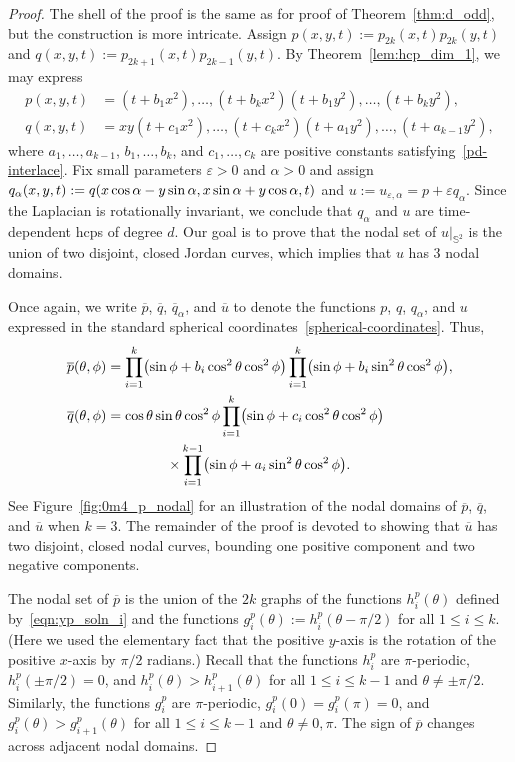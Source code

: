 \documentclass[10pt]{amsart}
\theoremstyle{definition}\newtheorem{defi}[theo]{Definition}\newtheorem{rema}[theo]{Remark}\newtheorem{exam}[theo]{Example}\newtheorem{exem}[theo]{Example}\newtheorem{nota}[theo]{Notation}
\newcommand{\sphere}{\mathbb{S}}
\newcommand{\ol}{\overline}
\renewcommand{\epsilon}{\varepsilon}
\let\originalleft\left
\let\originalright\right
\renewcommand{\left}{\mathopen{}\mathclose\bgroup\originalleft}
\renewcommand{\right}{\aftergroup\egroup\originalright}
\begin{document}
\begin{proof}
The shell of the proof is the same as for proof of Theorem~\ref{thm:d_odd}, but the construction is more intricate. Assign $p(x,y,t) := p_{2k}(x,t)p_{2k}(y,t)$ and $q(x,y,t):=p_{2k+1}(x,t)p_{2k-1}(y,t)$. By Theorem~\ref{lem:hcp_dim_1}, we may express
\begin{align*}
p(x,y,t) &= (t + b_1 x^2) ,\dots, (t + b_k x^2) (t+ b_1 y^2) ,\dots,  (t + b_ky^2),\\
q(x,y,t) &= xy(t + c_1 x^2),\dots, (t + c_{k} x^2)(t+a_1 y^2),\dots,  (t + a_{k-1} y^2),
\end{align*}
where $a_1,\dots,a_{k-1}$, $b_1,\dots,b_k$, and $c_1,\dots, c_k$ are positive constants satisfying~\eqref{pd-interlace}. Fix small parameters $\epsilon>0$ and $\alpha>0$ and assign $q_\alpha(x,y,t) := q(x \cos \alpha - y \sin \alpha,\linebreak x \sin \alpha + y \cos \alpha, t)$ and $u:=u_{\epsilon,\alpha}=p+\epsilon q_\alpha$. Since the Laplacian is rotationally invariant, we conclude that $q_\alpha$ and $u$ are time-dependent hcps of degree $d$. Our goal is to prove that the nodal set of $u|_{\sphere^2}$ is the union of two disjoint, closed Jordan curves, which implies that $u$ has 3 nodal domains.



Once again, we write $\ol{p}$, $\ol{q}$, $\ol{q}_\alpha$, and $\ol{u}$ to denote the functions $p$, $q$, $q_\alpha$, and $u$ expressed in the standard spherical coordinates~\eqref{spherical-coordinates}. Thus,
\begin{multline}
\begin{aligned}[t]
\ol{p}(\theta, \phi) & = \prod_{i=1}^k \left(\sin\phi + b_i \cos^2\theta \cos^2\phi\right)\prod_{i=1}^k\left(\sin\phi+b_i\sin^2 \theta \cos^2 \phi\right), \\
\ol{q}(\theta, \phi) & = \cos \theta \sin \theta \cos^2\phi \prod_{i=1}^{k} \left(\sin\phi+c_i\cos^2\theta\cos^2 \phi\right)
\end{aligned}
\\
\times\prod_{i=1}^{k-1} \left(\sin\phi+a_i\sin^2\theta\cos^2 \phi\right).
\end{multline}
See Figure~\ref{fig:0m4_p_nodal} for an illustration of the nodal domains of $\ol{p}$, $\ol{q}$, and $\ol{u}$ when $k=3$. The remainder of the proof is devoted to showing that $\ol{u}$ has two disjoint, closed nodal curves, bounding one positive component and two negative components.

The nodal set of $\ol{p}$ is the union of the $2k$ graphs of the functions $h^p_i(\theta)$ defined by~\eqref{eqn:yp_soln_i} and the functions $g^p_i(\theta):=h^p_i(\theta-\pi/2)$ for all $1\leq i\leq k$. (Here we used the elementary fact that the positive $y$-axis is the rotation of the positive $x$-axis by $\pi/2$ radians.) Recall that the functions $h^p_i$ are $\pi$-periodic, $h^p_i(\pm\pi/2)=0$, and $h^p_i(\theta)>h^p_{i+1}(\theta)$ for all $1\leq i\leq k-1$ and $\theta\neq\pm \pi/2$. Similarly, the functions $g^p_i$ are $\pi$-periodic, $g^p_i(0)=g^p_i(\pi)=0$, and $g^p_i(\theta)>g^p_{i+1}(\theta)$ for all $1\leq i\leq k -1$ and $\theta\neq 0,\pi$. The sign of $\ol{p}$ changes across adjacent nodal domains.


\end{proof}
\end{document}
